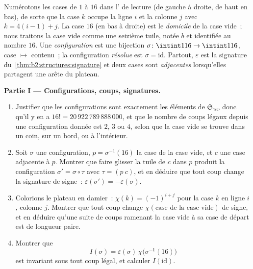 \begin{problem}
\label{pb:b2:structures:1}
Numérotons les cases de $1$ à $16$ dans l' de lecture (de gauche
à droite, de haut en bas), de sorte que la case $k$ occupe la ligne
$i$ et la colonne $j$ avec $k = 4(i - 1) + j$. La case $16$ (en bas à
droite) est le \emph{domicile} de la case vide~; nous traitons la
case vide comme une seizième tuile, notée $b$ et identifiée au nombre
$16$. Une \emph{configuration} est une bijection $\sigma \colon
\intint1{16} \to \intint1{16}$, case $\mapsto$ contenu~; la
configuration \emph{résolue} est $\sigma = \mathrm{id}$. Partout,
$\varepsilon$ est la signature du~\cref{thm:b2:structures:signature}
et deux cases sont \emph{adjacentes} lorsqu'elles partagent une arête
du plateau.

\medskip
\noindent\textbf{Partie I --- Configurations, coups, signatures.}
\begin{enumerate}
  \item Justifier que les configurations sont exactement les éléments
        de $\mathfrak{S}_{16}$, donc qu'il y en a $16! =
        20\,922\,789\,888\,000$, et que le nombre de coups légaux
        depuis une configuration donnée est $2$, $3$ ou $4$, selon
        que la case vide se trouve dans un coin, sur un bord, ou à
        l'intérieur.
  \item Soit $\sigma$ une configuration, $p = \sigma^{-1}(16)$ la
        case de la case vide, et $c$ une case adjacente à $p$.
        Montrer que faire glisser la tuile de $c$ dans $p$ produit la
        configuration $\sigma' = \sigma \circ \tau$ avec $\tau =
        (p\ c)$, et en déduire que tout coup change la signature de
        signe~: $\varepsilon(\sigma') = -\varepsilon(\sigma)$.
  \item Colorions le plateau en damier~: $\chi(k) = (-1)^{i+j}$ pour
        la case $k$ en ligne $i$, colonne $j$. Montrer que tout coup
        change $\chi(\text{case de la case vide})$ de signe, et en
        déduire qu'une suite de coups ramenant la case vide à sa case
        de départ est de longueur paire.
  \item Montrer que
        \[
        I(\sigma) = \varepsilon(\sigma)\,
        \chi\bigl(\sigma^{-1}(16)\bigr)
        \]
        est invariant sous tout coup légal, et calculer
        $I(\mathrm{id})$.
\end{enumerate}


\end{problem}
